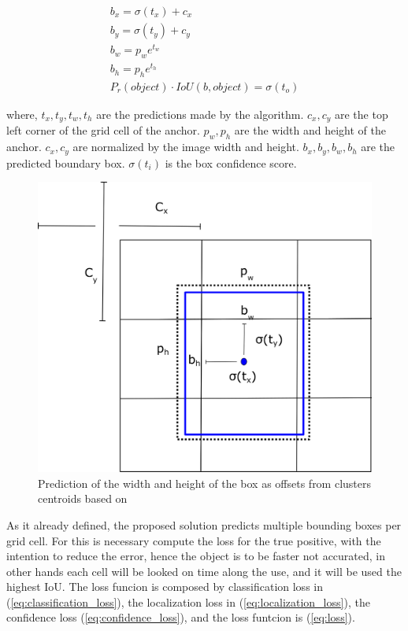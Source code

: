     
    \begin{equation}
    \label{eq:bound}
    \begin{aligned}
        b_x = \sigma(t_x) + c_x \\
        b_y = \sigma(t_y) + c_y \\
        b_w = p_we^{t_w} \\
        b_h = p_he^{t_h} \\
        P_r(object)\cdot IoU(b,object) = \sigma(t_o)
    \end{aligned}
    \end{equation}

where, $t_x, t_y, t_w, t_h$ are the predictions made by the algorithm. 
$c_x, c_y$ are the top left corner of the grid cell of the anchor.
$p_w, p_h$ are the width and height of the anchor. 
$c_x, c_y$ are normalized by the image width and height. 
$b_x, b_y, b_w, b_h$ are the predicted boundary box. 
$\sigma(t_i)$ is the box confidence score.

\begin{figure}[H]
\centering
\includegraphics[scale=0.5]{imagens/anchor.png}
\caption{Prediction of the width and height of the box as offsets from clusters centroids based on \cite{redmon2017yolo9000}}
\label{fig:anchor}
\end{figure}

As it already defined, the proposed solution predicts multiple bounding boxes per grid cell. For this is necessary compute the loss for the true positive, with the intention to reduce the error, hence the object is to be faster not accurated, in other hands each cell will be looked on time along the use, and it will be used the highest IoU. The loss funcion is composed by classification loss in (\ref{eq:classification_loss}), the localization loss in (\ref{eq:localization_loss}), the confidence loss (\ref{eq:confidence_loss}), and the loss funtcion is (\ref{eq:loss}). 

